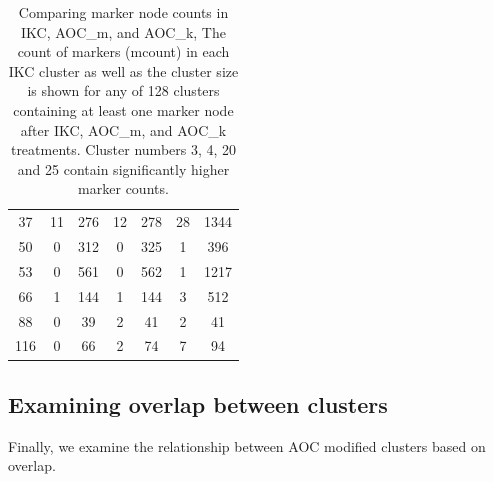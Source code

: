 \documentclass[12pt, oneside]{article}   	%
\begin{document}
\begin{table}[!ht]
{\begin{tabular}{ccccccc}
37 &  11 & 276 &  12 & 278 &  28 & 1344 \\ 
50 &   0 & 312 &   0 & 325 &   1 & 396 \\ 
53 &   0 & 561 &   0 & 562 &   1 & 1217 \\ 
66 &   1 & 144 &   1 & 144 &   3 & 512 \\ 
88 &   0 &  39 &   2 &  41 &   2 &  41 \\ 
116 &   0 &  66 &   2 &  74 &   7 &  94 \\ 
   \hline
\end{tabular}}
\captionsetup{width=0.9\textwidth}
\caption{Comparing marker node counts in IKC, AOC\_m, and AOC\_k, The count of markers (mcount) in each IKC cluster as well as the cluster size is shown for any of 128 clusters containing at least one marker node after IKC,  AOC\_m, and AOC\_k treatments. Cluster numbers 3, 4, 20 and 25 contain significantly higher marker counts.}
\label{tab:marker-node-table}
\end{table}

\subsection{Examining overlap between clusters}
Finally, we examine the relationship between AOC modified clusters based on overlap.
\end{document}
